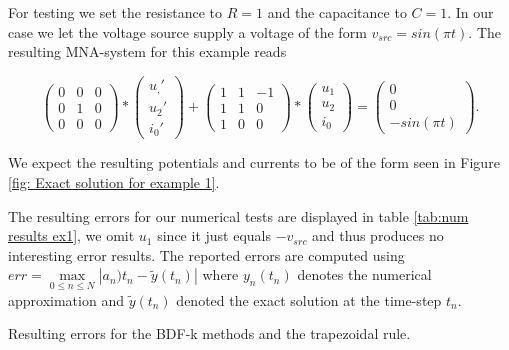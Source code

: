 \begin{example1}
	For testing we set the resistance to $R=1$ and the capacitance to $C=1$. In our case we let the  voltage source supply a voltage of the form $v_{src} = sin(\pi t)$. The resulting MNA-system for this example reads
	
	\begin{equation}
		\label{eq:MNA-system of chargin capacitor with explicit values}
		\begin{pmatrix}
			0 & 0 & 0 \\
			0 & 1 & 0 \\
			0 & 0 & 0
		\end{pmatrix}
		*
		\begin{pmatrix}
			u_,' \\
			u_2' \\
			i_0'
		\end{pmatrix}
		+
		\begin{pmatrix}
			1 & 1 & -1 \\
			1 & 1 & 0 \\
			1 & 0 & 0 
		\end{pmatrix}
		*
		\begin{pmatrix}
			u_1 \\
			u_2 \\
			i_0
		\end{pmatrix}
		=
		\begin{pmatrix}
			0 \\
			0 \\
			-sin(\pi t)
		\end{pmatrix}.
	\end{equation}
		
	We expect the resulting potentials and currents to be of the form seen in Figure \ref{fig: Exact solution for example 1}.

	The resulting errors for our numerical tests are displayed in table \ref{tab:num results ex1}, we omit $u_1$ since it just equals $-v_{src}$ and thus produces no interesting error results. The reported errors are computed using $err = \max\limits_{0 \leq n \leq N} | a_n)t_n - \tilde{y}(t_n) |$ where $y_n(t_n)$ denotes the numerical approximation and $\tilde{y}(t_n)$ denoted the exact solution at the time-step $t_n$. 
	
	\begin{table}[H]
		\caption{Resulting errors for the BDF-k methods and the trapezoidal rule.}
		\label{tab:num results ex1}
	\end{table}
	

\end{example1}
